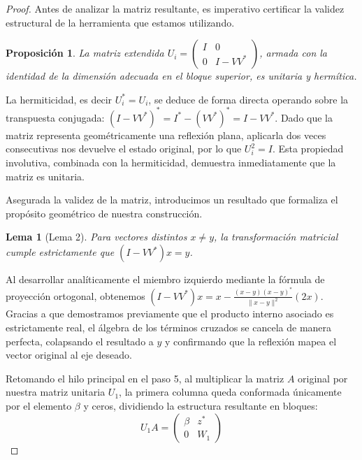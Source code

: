 \documentclass[12pt]{article}
\newtheorem{lema}{Lema}
\newtheorem{proposicion}{Proposición}
\begin{document}
\begin{proof}
Antes de analizar la matriz resultante, es imperativo certificar la validez estructural de la herramienta que estamos utilizando.

\begin{proposicion}
La matriz extendida $U_i = \begin{pmatrix} I & 0 \\ 0 & I - V V^* \end{pmatrix}$, armada con la identidad de la dimensión adecuada en el bloque superior, es unitaria y hermítica.
\end{proposicion}
La hermiticidad, es decir $U_i^* = U_i$, se deduce de forma directa operando sobre la transpuesta conjugada: $(I - V V^*)^* = I^* - (V V^*)^* = I - V V^*$. Dado que la matriz representa geométricamente una reflexión plana, aplicarla dos veces consecutivas nos devuelve el estado original, por lo que $U_i^2 = I$. Esta propiedad involutiva, combinada con la hermiticidad, demuestra inmediatamente que la matriz es unitaria.

Asegurada la validez de la matriz, introducimos un resultado que formaliza el propósito geométrico de nuestra construcción.
\begin{lema}[Lema 2]
Para vectores distintos $x \neq y$, la transformación matricial cumple estrictamente que $(I - V V^*) x = y$.
\end{lema}
Al desarrollar analíticamente el miembro izquierdo mediante la fórmula de proyección ortogonal, obtenemos $(I - V V^*)x = x - \frac{(x-y)(x-y)^*}{\|x-y\|^2} (2x)$. Gracias a que demostramos previamente que el producto interno asociado es estrictamente real, el álgebra de los términos cruzados se cancela de manera perfecta, colapsando el resultado a $y$ y confirmando que la reflexión mapea el vector original al eje deseado.

Retomando el hilo principal en el paso 5, al multiplicar la matriz $A$ original por nuestra matriz unitaria $U_1$, la primera columna queda conformada únicamente por el elemento $\beta$ y ceros, dividiendo la estructura resultante en bloques:
\begin{equation}
U_1 A = \begin{pmatrix} \beta & z^* \\ 0 & W_1 \end{pmatrix}
\end{equation}


\end{proof}
\end{document}

